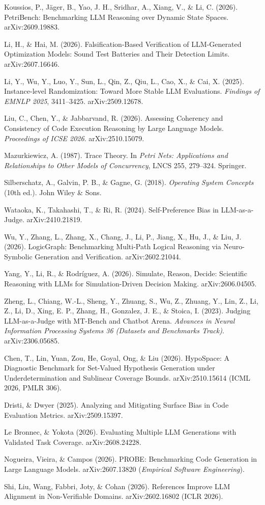 \documentclass[11pt]{article}
\begin{document}
\begin{enumerate}[label={[\arabic*]}]
\item Koussios, P., Jäger, B., Yao, J. H., Sridhar, A., Xiang, V., \& Li, C. (2026). PetriBench: Benchmarking LLM Reasoning over Dynamic State Spaces. arXiv:2609.19883.
\item Li, H., \& Hai, M. (2026). Falsification-Based Verification of LLM-Generated Optimization Models: Sound Test Batteries and Their Detection Limits. arXiv:2607.16646.
\item Li, Y., Wu, Y., Luo, Y., Sun, L., Qin, Z., Qiu, L., Cao, X., \& Cai, X. (2025). Instance-level Randomization: Toward More Stable LLM Evaluations. \emph{Findings of EMNLP 2025}, 3411--3425. arXiv:2509.12678.
\item Liu, C., Chen, Y., \& Jabbarvand, R. (2026). Assessing Coherency and Consistency of Code Execution Reasoning by Large Language Models. \emph{Proceedings of ICSE 2026}. arXiv:2510.15079.
\item Mazurkiewicz, A. (1987). Trace Theory. In \emph{Petri Nets: Applications and Relationships to Other Models of Concurrency}, LNCS 255, 279--324. Springer.
\item Silberschatz, A., Galvin, P. B., \& Gagne, G. (2018). \emph{Operating System Concepts} (10th ed.). John Wiley \& Sons.
\item Wataoka, K., Takahashi, T., \& Ri, R. (2024). Self-Preference Bias in LLM-as-a-Judge. arXiv:2410.21819.
\item Wu, Y., Zhang, L., Zhang, X., Chang, J., Li, P., Jiang, X., Hu, J., \& Liu, J. (2026). LogicGraph: Benchmarking Multi-Path Logical Reasoning via Neuro-Symbolic Generation and Verification. arXiv:2602.21044.
\item Yang, Y., Li, R., \& Rodríguez, A. (2026). Simulate, Reason, Decide: Scientific Reasoning with LLMs for Simulation-Driven Decision Making. arXiv:2606.04505.
\item Zheng, L., Chiang, W.-L., Sheng, Y., Zhuang, S., Wu, Z., Zhuang, Y., Lin, Z., Li, Z., Li, D., Xing, E. P., Zhang, H., Gonzalez, J. E., \& Stoica, I. (2023). Judging LLM-as-a-Judge with MT-Bench and Chatbot Arena. \emph{Advances in Neural Information Processing Systems 36 (Datasets and Benchmarks Track)}. arXiv:2306.05685.
\item Chen, T., Lin, Yuan, Zou, He, Goyal, Ong, \& Liu (2026). HypoSpace: A Diagnostic Benchmark for Set-Valued Hypothesis Generation under Underdetermination and Sublinear Coverage Bounds. arXiv:2510.15614 (ICML 2026, PMLR 306).
\item Dristi, \& Dwyer (2025). Analyzing and Mitigating Surface Bias in Code Evaluation Metrics. arXiv:2509.15397.
\item Le Bronnec, \& Yokota (2026). Evaluating Multiple LLM Generations with Validated Task Coverage. arXiv:2608.24228.
\item Nogueira, Vieira, \& Campos (2026). PROBE: Benchmarking Code Generation in Large Language Models. arXiv:2607.13820 (\emph{Empirical Software Engineering}).
\item Shi, Liu, Wang, Fabbri, Joty, \& Cohan (2026). References Improve LLM Alignment in Non-Verifiable Domains. arXiv:2602.16802 (ICLR 2026).
\end{enumerate}
\end{document}
